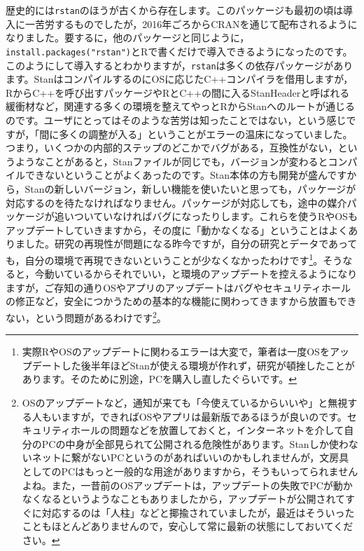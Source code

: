 \documentclass{ltjsbook}
\begin{document}
歴史的には\verb|rstan|のほうが古くから存在します。このパッケージも最初の頃は導入に一苦労するものでしたが，2016年ごろからCRANを通じて配布されるようになりました。要するに，他のパッケージと同じように，\verb|install.packages("rstan")|とRで書くだけで導入できるようになったのです。このようにして導入するとわかりますが，\verb|rstan|は多くの依存パッケージがあります。StanはコンパイルするのにOSに応じたC++コンパイラを借用しますが，RからC++を呼び出すパッケージやRとC++の間に入るStanHeaderと呼ばれる緩衝材など，関連する多くの環境を整えてやっとRからStanへのルートが通じるのです。ユーザにとってはそのような苦労は知ったことではない，という感じですが，「間に多くの調整が入る」ということがエラーの温床になっていました。つまり，いくつかの内部的ステップのどこかでバグがある，互換性がない，というようなことがあると，Stanファイルが同じでも，バージョンが変わるとコンパイルできないということがよくあったのです。Stan本体の方も開発が盛んですから，Stanの新しいバージョン，新しい機能を使いたいと思っても，パッケージが対応するのを待たなければなりません。パッケージが対応しても，途中の媒介パッケージが追いついていなければバグになったりします。これらを使うRやOSもアップデートしていきますから，その度に「動かなくなる」ということはよくありました。研究の再現性が問題になる昨今ですが，自分の研究とデータであっても，自分の環境で再現できないということが少なくなかったわけです\footnote{実際RやOSのアップデートに関わるエラーは大変で，筆者は一度OSをアップデートした後半年ほどStanが使える環境が作れず，研究が頓挫したことがあります。そのために別途，PCを購入し直したぐらいです。}。そうなると，今動いているからそれでいい，と環境のアップデートを控えるようになりますが，ご存知の通りOSやアプリのアップデートはバグやセキュリティホールの修正など，安全につかうための基本的な機能に関わってきますから放置もできない，という問題があるわけです\footnote{OSのアップデートなど，通知が来ても「今使えているからいいや」と無視する人もいますが，できればOSやアプリは最新版であるほうが良いのです。セキュリティホールの問題などを放置しておくと，インターネットを介して自分のPCの中身が全部見られて公開される危険性があります。Stanしか使わないネットに繋がないPCというのがあればいいのかもしれませんが，文房具としてのPCはもっと一般的な用途がありますから，そうもいってられませんよね。また，一昔前のOSアップデートは，アップデートの失敗でPCが動かなくなるというようなこともありましたから，アップデートが公開されてすぐに対応するのは「人柱」などと揶揄されていましたが，最近はそういったこともほとんどありませんので，安心して常に最新の状態にしておいてください。}。
\end{document}
